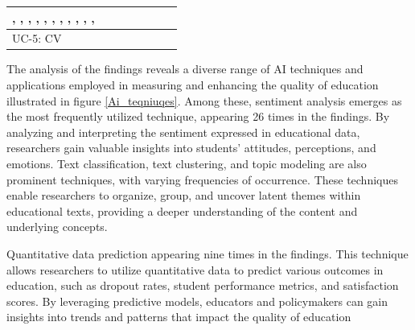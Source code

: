\begin{table}[htbp]
\begin{tabular}{|l|p{0.45\linewidth}|}
\cite{Romanov}\cite{Research_on_the_Application_of_BP_Neural_Network_in_Vocal_Music_Teaching_Quality_Evaluation}, \cite{Design_of_online_teaching_quality_evaluation_system_for_Private_University_Research_based_on_deep_learning_algorithm}, \cite{BP_Neural_Network-Based_Evaluation_on_University_Teachers'_Teaching_Quality}, \cite{An_Improved_BP_Neural_Network-Based_Quality_Evaluation_Model_for_Chinese_International_Education_Teaching_Courses}, \cite{Evaluation_Model_of_PE_Teaching_Quality_Based_on_Active_Learning_Support_Vector_Machine}, \cite{Evaluation_System_of_Tourism_Psychology_Teaching_Quality_Based_on_Convolutional_Neural_Network}, \cite{An_Evaluation_Model_of_Moral_Education_Teaching_Quality_in_Universities_Based_on_System_Control_Theory}, \cite{Research_on_the_Application_of_BP_Neural_Network_in_the_Evaluation_of_College_Teaching_Quality}, \cite{The_Evaluation_and_Application_of_BP_Neural_Network_in_the_Multiple_Quality_Assurance_Paths_of_Higher_Education}, \cite{Evaluating_the_quality_of_teaching_in_higher_education_institutes_using_clustering_approach_and_set_pair_analysis}, \cite{Automatic_Rules_Generation_for_Teaching_Strategies_Improvement}, \cite{Exploring_Causes_for_the_Dropout_on_Massive_Open_Online_Courses} \\ \hline
UC-5: CV & \cite{Research_on_Evaluation_of_Online_Teaching_Effect_based_on_Deep_Learning_Technology} \\ \hline
\end{tabular}
\end{table}


The analysis of the findings reveals a diverse range of AI techniques and applications employed in measuring and enhancing the quality of education illustrated in figure \ref{Ai_teqniuqes}. Among these, sentiment analysis emerges as the most frequently utilized technique, appearing 26 times in the findings. By analyzing and interpreting the sentiment expressed in educational data, researchers gain valuable insights into students' attitudes, perceptions, and emotions.
Text classification, text clustering, and topic modeling are also prominent techniques, with varying frequencies of occurrence. These techniques enable researchers to organize, group, and uncover latent themes within educational texts, providing a deeper understanding of the content and underlying concepts.

Quantitative data prediction appearing nine times in the findings. This technique allows researchers to utilize quantitative data to predict various outcomes in education, such as dropout rates, student performance metrics, and satisfaction scores. By leveraging predictive models, educators and policymakers can gain insights into trends and patterns that impact the quality of education

